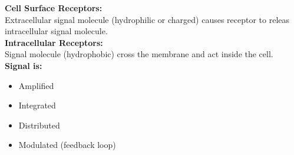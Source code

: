 \textbf{Cell Surface Receptors:}\\
Extracellular signal molecule (hydrophilic or charged) causes receptor to releas intracellular signal molecule.\\

\textbf{Intracellular Receptors:}\\
Signal molecule (hydrophobic) cross the membrane and act inside the cell.\\

\textbf{Signal is:}\\
\begin{minipage}{0.3\linewidth}
    \begin{itemize}
        \item Amplified
        \item Integrated
    \end{itemize}
\end{minipage}
\begin{minipage}{0.6\linewidth}
    \begin{itemize}
        \item Distributed
        \item Modulated (feedback loop)
    \end{itemize}
\end{minipage}